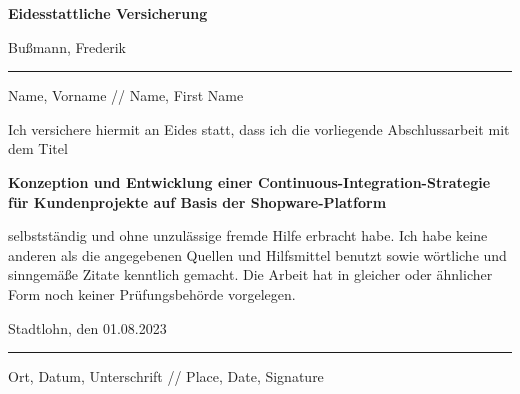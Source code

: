 
\thispagestyle{empty}
    \begingroup
        \fontsize{18pt}{20pt}\selectfont
        {\bfseries Eidesstattliche Versicherung}
    \endgroup

    \vskip 0.8cm

    \begingroup
        \fontsize{12pt}{18pt}\selectfont
        Bußmann, Frederik
    \endgroup

    \vskip -0.35cm

    \noindent\rule{14.4cm}{0.4pt}

    \vskip -0.2cm

    \begingroup
        \fontsize{8pt}{6pt}\selectfont
        Name, Vorname // Name, First Name
    \endgroup

    \vskip 0.6cm
    \begingroup
        \fontsize{10.5pt}{11.5pt}\selectfont
        Ich versichere hiermit an Eides statt, dass ich die vorliegende Abschlussarbeit mit dem Titel
    \endgroup

    \vskip 0.3cm

    \begingroup
        \fontsize{12pt}{18pt}\selectfont
        {\bfseries Konzeption und Entwicklung einer Continuous-Integration-Strategie für Kundenprojekte auf Basis der
        Shopware-Platform}
    \endgroup

    \vskip 0.3cm

    \begingroup
        \fontsize{10.5pt}{11.5pt}\selectfont
        selbstständig und ohne unzulässige fremde Hilfe erbracht habe.
        Ich habe keine anderen als die angegebenen Quellen und Hilfsmittel benutzt sowie wörtliche und sinngemäße
        Zitate kenntlich gemacht.
        Die Arbeit hat in gleicher oder ähnlicher Form noch keiner Prüfungsbehörde vorgelegen.
    \endgroup

    \vskip 0.8cm
    {\fontsize{12pt}{18pt}\selectfont
    Stadtlohn, den 01.08.2023}

    \vskip -0.35cm

    \noindent\rule{14.4cm}{0.4pt}

    \vskip -0.2cm

    \begingroup
        \fontsize{8pt}{6pt}\selectfont
        Ort, Datum, Unterschrift // Place, Date, Signature
    \endgroup
\restoregeometry
\clearpage

